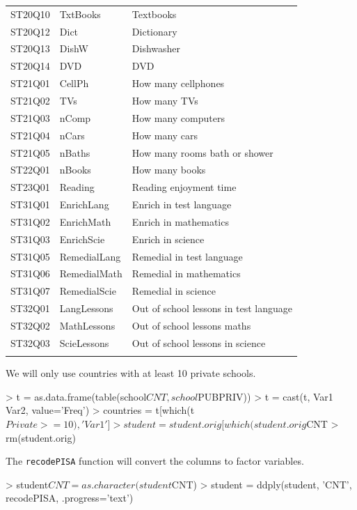 \documentclass[letterpaper,11pt]{article}
\begin{document}
\begin{longtable}{lll}
  ST20Q10 & TxtBooks & Textbooks \\ 
  ST20Q12 & Dict & Dictionary \\ 
  ST20Q13 & DishW & Dishwasher \\ 
  ST20Q14 & DVD & DVD \\ 
  ST21Q01 & CellPh & How many cellphones \\ 
  ST21Q02 & TVs & How many TVs \\ 
  ST21Q03 & nComp & How many computers \\ 
  ST21Q04 & nCars & How many cars \\ 
  ST21Q05 & nBaths & How many rooms bath or shower \\ 
  ST22Q01 & nBooks & How many books \\ 
  ST23Q01 & Reading & Reading enjoyment time \\ 
  ST31Q01 & EnrichLang & Enrich in test language \\ 
  ST31Q02 & EnrichMath & Enrich in mathematics \\ 
  ST31Q03 & EnrichScie & Enrich in science \\ 
  ST31Q05 & RemedialLang & Remedial in test language \\ 
  ST31Q06 & RemedialMath & Remedial in mathematics \\ 
  ST31Q07 & RemedialScie & Remedial in science \\ 
  ST32Q01 & LangLessons & Out of school lessons in test language \\ 
  ST32Q02 & MathLessons & Out of school lessons maths \\ 
  ST32Q03 & ScieLessons & Out of school lessons in science \\ 
   \hline
\hline
\label{covariates}
\end{longtable}
We will only use countries with at least 10 private schools.

\begin{Schunk}
\begin{Sinput}
> t = as.data.frame(table(school$CNT, school$PUBPRIV))
> t = cast(t, Var1 ~ Var2, value='Freq')
> countries = t[which(t$Private >= 10), 'Var1']
> student = student.orig[which(student.orig$CNT %
> rm(student.orig)
\end{Sinput}
\end{Schunk}

The \texttt{recodePISA} function will convert the columns to factor variables.

\begin{Schunk}
\begin{Sinput}
> student$CNT = as.character(student$CNT)
> student = ddply(student, 'CNT', recodePISA, .progress='text')
\end{Sinput}
\end{Schunk}
\end{document}
